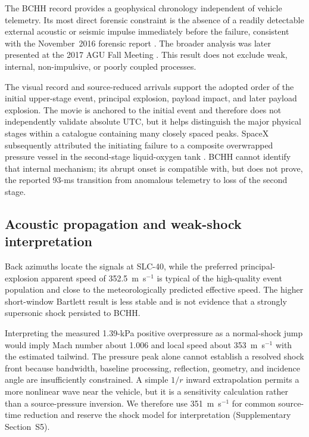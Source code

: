 \documentclass[]{seismica}
\begin{document}
The BCHH record provides a geophysical chronology independent of vehicle
telemetry. Its most direct forensic constraint is the absence of a readily
detectable external acoustic or seismic impulse immediately before the
failure, consistent with the November~2016 forensic report
\citep{thompson_mcnutt_fireball_2016}. The broader analysis was later presented
at the 2017 AGU Fall Meeting \citep{thompson_agu_falcon9_2017}. This result does
not exclude weak, internal, non-impulsive, or poorly coupled processes.

The visual record and source-reduced arrivals support the adopted order of the
initial upper-stage event, principal explosion, payload impact, and later
payload explosion. The movie is anchored to the initial event and therefore
does not independently validate absolute UTC, but it helps distinguish the
major physical stages within a catalogue containing many closely spaced peaks.
SpaceX subsequently attributed the initiating failure to a composite
overwrapped pressure vessel in the second-stage liquid-oxygen tank
\citep{spacex_anomaly_2017,nasa_sma_falcon9}. BCHH cannot identify that
internal mechanism; its abrupt onset is compatible with, but does not prove,
the reported 93-ms transition from anomalous telemetry to loss of the second
stage.

\subsection{Acoustic propagation and weak-shock interpretation}

Back azimuths locate the signals at SLC-40, while the preferred
principal-explosion apparent speed of 352.5~m~s$^{-1}$ is typical of the
high-quality event population and close to the meteorologically predicted
effective speed. The higher short-window Bartlett result is less stable and is
not evidence that a strongly supersonic shock persisted to BCHH.

Interpreting the measured 1.39-kPa positive overpressure as a normal-shock jump
would imply Mach number about 1.006 and local speed about 353~m~s$^{-1}$ with
the estimated tailwind. The pressure peak alone cannot establish a resolved
shock front because bandwidth, baseline processing, reflection, geometry, and
incidence angle are insufficiently constrained. A simple $1/r$ inward
extrapolation permits a more nonlinear wave near the vehicle, but it is a
sensitivity calculation rather than a source-pressure inversion. We therefore
use 351~m~s$^{-1}$ for common source-time reduction and reserve the shock model
for interpretation (Supplementary Section~S5).
\end{document}
